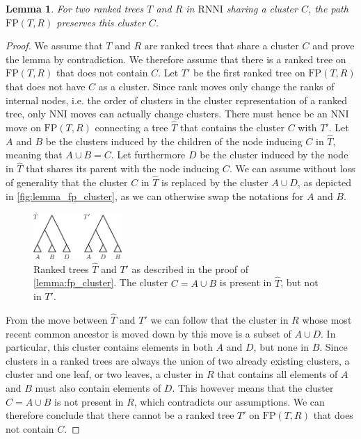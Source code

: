 \documentclass[11pt]{amsart}
\newtheorem{lemma}{Lemma}
\newcommand{\rnni}{\mathrm{RNNI}}
\newcommand{\nni}{\mathrm{NNI}}
\newcommand{\fp}{\mathrm{FP}}
\begin{document}
\begin{lemma}
	For two ranked trees $T$ and $R$ in $\rnni$ sharing a cluster $C$, the path $\fp(T,R)$ preserves this cluster $C$.
	\label{lemma:fp_cluster}
\end{lemma}

\begin{proof}
	We assume that $T$ and $R$ are ranked trees that share a cluster $C$ and prove the lemma by contradiction.
	We therefore assume that there is a ranked tree on $\fp(T,R)$ that does not contain $C$.
	Let $T'$ be the first ranked tree on $\fp(T,R)$ that does not have $C$ as a cluster.
	Since rank moves only change the ranks of internal nodes, i.e. the order of clusters in the cluster representation of a ranked tree, only $\nni$ moves can actually change clusters.
	There must hence be an $\nni$ move on $\fp(T,R)$ connecting a tree $\hat T$ that contains the cluster $C$ with $T'$.
	Let $A$ and $B$ be the clusters induced by the children of the node inducing $C$ in $\hat T$, meaning that $A \cup B = C$.
	Let furthermore $D$ be the cluster induced by the node in $\hat T$ that shares its parent with the node inducing $C$.
	We can assume without loss of generality that the cluster $C$ in $\hat T$ is replaced by the cluster $A \cup D$, as depicted in \autoref{fig:lemma_fp_cluster}, as we can otherwise swap the notations for $A$ and $B$.

	\begin{figure}[ht]
		\includegraphics[width=0.3\textwidth]{fp_cluster.eps}
		\caption{Ranked trees $\hat T$ and $T'$ as described in the proof of \autoref{lemma:fp_cluster}.
		The cluster $C = A \cup B$ is present in $\hat T$, but not in $T'$.}
		\label{fig:lemma_fp_cluster}
	\end{figure}

	From the move between $\hat T$ and $T'$ we can follow that the cluster in $R$ whose most recent common ancestor is moved down by this move is a subset of $A \cup D$.
	In particular, this cluster contains elements in both $A$ and $D$, but none in $B$.
	Since clusters in a ranked trees are always the union of two already existing clusters, a cluster and one leaf, or two leaves, a cluster in $R$ that contains all elements of $A$ and $B$ must also contain elements of $D$.
	This however means that the cluster $C = A \cup B$ is not present in $R$, which contradicts our assumptions.
	We can therefore conclude that there cannot be a ranked tree $T'$ on $\fp(T,R)$ that does not contain $C$.
\end{proof}
\end{document}
